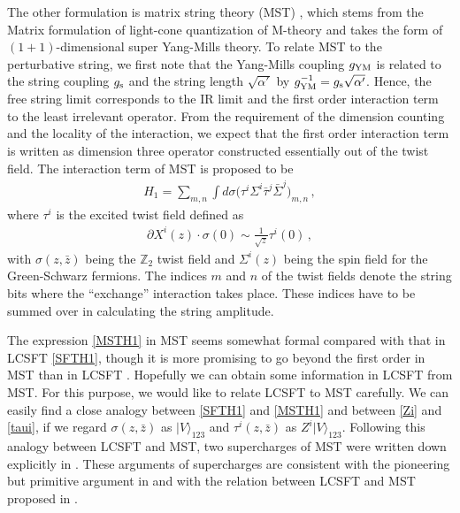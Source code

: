 \documentclass[12pt]{article}
\begin{document}
The other formulation is matrix string theory (MST) \cite{MSSBS,DVV},
which stems from the Matrix formulation of light-cone quantization of
M-theory \cite{BFSS} and takes the form of $(1+1)$-dimensional super
Yang-Mills theory.
To relate MST to the perturbative string, we first note that the
Yang-Mills coupling $g_{{\rm YM}}$ is related to the string coupling
$g_{{\rm s}}$ and the string length $\sqrt{\alpha'}$ by
$g_{{\rm YM}}^{-1}=g_{{\rm s}}\sqrt{\alpha'}$.
Hence, the free string limit corresponds to the IR limit and the first 
order interaction term to the least irrelevant operator.
{}From the requirement of the dimension counting and the locality of
the interaction, we expect that the first order interaction term is
written as dimension three operator constructed essentially out of the
twist field.
The interaction term of MST is proposed to be
\cite{DVV}
\begin{align}
H_1=\sum_{m,n}\int d\sigma
\bigl(\tau^i\Sigma^i\bar\tau^j\bar\Sigma^j\bigr)_{m,n}\,,
\label{MSTH1}
\end{align}
where $\tau^i$ is the excited twist field defined as
\begin{align}
\partial X^i(z)\cdot\sigma(0)\sim\frac{1}{\sqrt{z}}\tau^i(0)\,,
\label{taui}
\end{align}
with $\sigma(z,\bar z)$ being the ${\mathbb Z}_2$ twist field and
$\Sigma^i(z)$ being the spin field for the Green-Schwarz fermions.
The indices $m$ and $n$ of the twist fields denote the string bits
where the ``exchange'' interaction takes place.
These indices have to be summed over in calculating the string
amplitude.

The expression \eqref{MSTH1} in MST seems somewhat formal compared
with that in LCSFT \eqref{SFTH1}, though it is more promising to go
beyond the first order in MST than in LCSFT \cite{DM}.
Hopefully we can obtain some information in LCSFT from MST.
For this purpose, we would like to relate LCSFT to MST carefully.
We can easily find a close analogy between \eqref{SFTH1} and
\eqref{MSTH1} and between \eqref{Zi} and \eqref{taui}, if we regard
$\sigma(z,\bar z)$ as $|V\rangle_{123}$ and $\tau^i(z,\bar z)$ as
$Z^i|V\rangle_{123}$.
Following this analogy between LCSFT and MST, two supercharges of MST
were written down explicitly in \cite{M}.
These arguments of supercharges are consistent with the pioneering but
primitive argument in \cite{DVV} and with the relation between LCSFT
and MST proposed in \cite{DM}.
\end{document}
